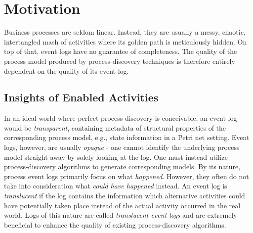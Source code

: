 \section{Motivation}
\label{sec:intro_ssec:motiv}



\begin{comment}
    In this section, you explain to the reader why:

\begin{enumerate}
    \item The problem you are solving is relevant to be solved.
    \item The existing solutions do not solve the problem and/or have significant problems/shortcomings when doing so.
\end{enumerate}
Note that parts of this section are already highlighted in both the abstract and the introduction.
However, in this section, you dive a bit deeper.
In a good motivation, you show a (simple) example on which current methods fail, yet, the method that you are going to describe in this thesis actually yields a better result.

For example, assume that your thesis describes a new \emph{process-discovery} algorithm that is able to handle noise, incomplete behavior, and, on top of that, is able to apply label-splitting.
You can take an (example) event log and show that existing algorithms result in models that are of suboptimal quality.
Finally, you show a model discovered by your fancy algorithm, and, you explain why this model is so much better.
\end{comment}

Business processes are seldom linear. Instead, they are usually a messy, chaotic, intertangled mash of activities where its golden path is meticulously hidden. On top of that, event logs have no guarantee of completeness. The quality of the process model produced by process-discovery techniques is therefore entirely dependent on the quality of its event log.

\subsection{Insights of Enabled Activities}

In an ideal world where perfect process discovery is conceivable, an event log would be \emph{transparent}, containing metadata of structural properties of the corresponding process model, e.g., state information in a Petri net setting. Event logs, however, are usually \emph{opaque} - one cannot identify the underlying process model straight away by solely looking at the log. One must instead utilize process-discovery algorithms to generate corresponding models. By its nature, process event logs primarily focus on what \emph{happened}. However, they often do not take into consideration what \emph{could have happened} instead. An event log is \textit{translucent} if the log contains the information which alternative activities could have potentially taken place instead of the actual activity occurred in the real world. Logs of this nature are called \textit{translucent event logs} and are extremely beneficial to enhance the quality of existing process-discovery algorithms.

